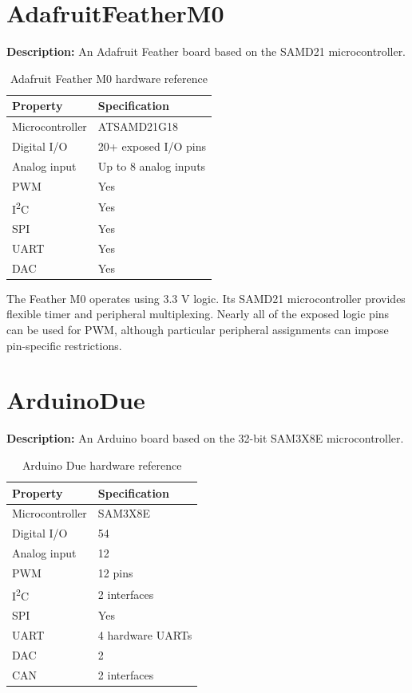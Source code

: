 \newpage
\section{AdafruitFeatherM0}

\textbf{Description:} An Adafruit Feather board based on the SAMD21
microcontroller.

\begin{table}[H]
\centering
\caption{Adafruit Feather M0 hardware reference}
\label{tab:board-feather-m0}
\begin{tabular}{ll}
\toprule
\textbf{Property} & \textbf{Specification} \\
\midrule
Microcontroller & ATSAMD21G18 \\
Digital I/O & 20+ exposed I/O pins \\
Analog input & Up to 8 analog inputs \\
PWM & Yes \\
I\textsuperscript{2}C & Yes \\
SPI & Yes \\
UART & Yes \\
DAC & Yes \\
\bottomrule
\end{tabular}
\end{table}

The Feather M0 operates using 3.3 V logic. Its SAMD21 microcontroller
provides flexible timer and peripheral multiplexing. Nearly all of the
exposed logic pins can be used for PWM, although particular peripheral
assignments can impose pin-specific restrictions.

\section{ArduinoDue}

\textbf{Description:} An Arduino board based on the 32-bit SAM3X8E
microcontroller.

\begin{table}[H]
\centering
\caption{Arduino Due hardware reference}
\label{tab:board-arduino-due}
\begin{tabular}{ll}
\toprule
\textbf{Property} & \textbf{Specification} \\
\midrule
Microcontroller & SAM3X8E \\
Digital I/O & 54 \\
Analog input & 12 \\
PWM & 12 pins \\
I\textsuperscript{2}C & 2 interfaces \\
SPI & Yes \\
UART & 4 hardware UARTs \\
DAC & 2 \\
CAN & 2 interfaces \\
\bottomrule
\end{tabular}
\end{table}

